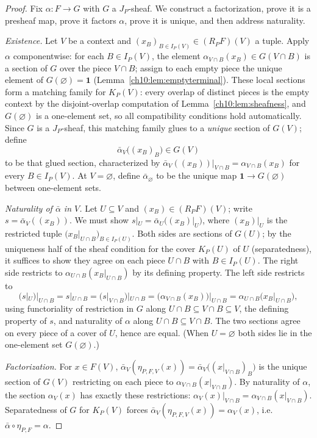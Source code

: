 \begin{proof}
Fix $\alpha : F \to G$ with $G$ a $J_P$-sheaf. We construct a factorization,
prove it is a presheaf map, prove it factors $\alpha$, prove it is unique, and
then address naturality.

\emph{Existence.} Let $V$ be a context and
$(x_B)_{B \in I_P(V)} \in (R_P F)(V)$ a tuple. Apply $\alpha$ componentwise:
for each $B \in I_P(V)$, the element
$\alpha_{V \cap B}(x_B) \in G(V \cap B)$ is a section of $G$ over the piece
$V \cap B$; assign to each empty piece the unique element of
$G(\varnothing) = \mathbf{1}$ (Lemma~\ref{ch10:lem:emptyterminal}). These
local sections form a matching family for $K_P(V)$: every overlap of distinct
pieces is the empty context by the disjoint-overlap computation of
Lemma~\ref{ch10:lem:sheafness}, and $G(\varnothing)$ is a one-element set, so
all compatibility conditions hold automatically. Since $G$ is a $J_P$-sheaf,
this matching family glues to a \emph{unique} section of $G(V)$; define
\[
\bar{\alpha}_V\bigl((x_B)_B\bigr) \in G(V)
\]
to be that glued section, characterized by
$\bar{\alpha}_V((x_B))|_{V \cap B} = \alpha_{V \cap B}(x_B)$ for every
$B \in I_P(V)$. At $V = \varnothing$, define $\bar{\alpha}_\varnothing$ to be
the unique map $\mathbf{1} \to G(\varnothing)$ between one-element sets.

\emph{Naturality of $\bar{\alpha}$ in $V$.} Let $U \subseteq V$ and
$(x_B) \in (R_P F)(V)$; write $s = \bar{\alpha}_V((x_B))$. We must show
$s|_U = \bar{\alpha}_U\bigl((x_B)|_U\bigr)$, where $(x_B)|_U$ is the
restricted tuple $\bigl( x_B|_{U \cap B} \bigr)_{B \in I_P(U)}$. Both sides
are sections of $G(U)$; by the uniqueness half of the sheaf condition for the
cover $K_P(U)$ of $U$ (separatedness), it suffices to show they agree on each
piece $U \cap B$ with $B \in I_P(U)$. The right side restricts to
$\alpha_{U \cap B}(x_B|_{U \cap B})$ by its defining property. The left side
restricts to
\[
(s|_U)|_{U \cap B} = s|_{U \cap B} = \bigl( s|_{V \cap B} \bigr)|_{U \cap B}
= \bigl( \alpha_{V \cap B}(x_B) \bigr)|_{U \cap B}
= \alpha_{U \cap B}\bigl( x_B|_{U \cap B} \bigr),
\]
using functoriality of restriction in $G$ along
$U \cap B \subseteq V \cap B \subseteq V$, the defining property of $s$, and
naturality of $\alpha$ along $U \cap B \subseteq V \cap B$. The two sections
agree on every piece of a cover of $U$, hence are equal. (When
$U = \varnothing$ both sides lie in the one-element set $G(\varnothing)$.)

\emph{Factorization.} For $x \in F(V)$,
$\bar{\alpha}_V(\eta_{P, F, V}(x)) = \bar{\alpha}_V\bigl((x|_{V \cap B})_B\bigr)$
is the unique section of $G(V)$ restricting on each piece to
$\alpha_{V \cap B}(x|_{V \cap B})$. By naturality of $\alpha$, the section
$\alpha_V(x)$ has exactly these restrictions:
$\alpha_V(x)|_{V \cap B} = \alpha_{V \cap B}(x|_{V \cap B})$. Separatedness of
$G$ for $K_P(V)$ forces $\bar{\alpha}_V(\eta_{P, F, V}(x)) = \alpha_V(x)$,
i.e. $\bar{\alpha} \circ \eta_{P, F} = \alpha$.


\end{proof}
